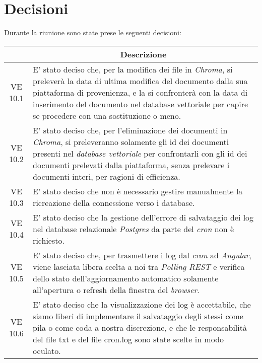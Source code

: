 

\section{Decisioni}

Durante la riunione sono state prese le seguenti decisioni:

\vspace{0.5cm}

\begin{table}[htbp]
    \centering
    \begin{tabular}{|c|p{}|}
        \hline
        \rowcolor[gray]{0.75}
        \multicolumn{1}{|c|}{\textbf{Codice}} & \multicolumn{1}{|c|}{\textbf{Descrizione}}\\
        \hline
        VE 10.1 & E' stato deciso che, per la modifica dei file in \emph{Chroma}, si preleverà la data di ultima modifica del documento dalla sua piattaforma di provenienza, e la si confronterà con la data di inserimento del documento nel database vettoriale per capire se procedere con una sostituzione o meno.\\
        \hline
        VE 10.2 & E' stato deciso che, per l'eliminazione dei documenti in \emph{Chroma}, si preleveranno solamente gli id dei documenti presenti nel \emph{database vettoriale} per confrontarli con gli id dei documenti prelevati dalla piattaforma, senza prelevare i documenti interi, per ragioni di efficienza.\\
        \hline
        VE 10.3 & E' stato deciso che non è necessario gestire manualmente la ricreazione della connessione verso i database.\\
        \hline
        VE 10.4 & E' stato deciso che la gestione dell'errore di salvataggio dei log nel database relazionale \emph{Postgres} da parte del \emph{cron} non è richiesto.\\
        \hline
        VE 10.5 & E' stato deciso che, per trasmettere i log dal \emph{cron} ad \emph{Angular}, viene lasciata libera scelta a noi tra \emph{Polling REST} e verifica dello stato dell'aggiornamento automatico solamente all'apertura o refresh della finestra del \emph{browser}.\\
        \hline
        VE 10.6 & E' stato deciso che la visualizzazione dei log è accettabile, che siamo liberi di implementare il salvataggio degli stessi come pila o come coda a nostra discrezione, e che le responsabilità del file txt e del file cron.log sono state scelte in modo oculato.\\

\end{tabular}
\end{table}
